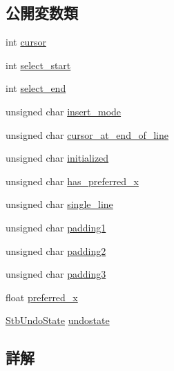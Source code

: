 \subsection*{公開変数類}
\begin{DoxyCompactItemize}
\item 
int \mbox{\hyperlink{struct_s_t_b___textedit_state_a7a1414f3286070306a5184f9473ccf9f}{cursor}}
\item 
int \mbox{\hyperlink{struct_s_t_b___textedit_state_a74d595403e0b6f99cd0163ee87f4344d}{select\+\_\+start}}
\item 
int \mbox{\hyperlink{struct_s_t_b___textedit_state_abf8b1b1064770e4579c5bb8c4a41d8f0}{select\+\_\+end}}
\item 
unsigned char \mbox{\hyperlink{struct_s_t_b___textedit_state_af26029a4f1f76d043afd35072fabcb4b}{insert\+\_\+mode}}
\item 
unsigned char \mbox{\hyperlink{struct_s_t_b___textedit_state_a0e7ba5f610f5dc2d643bef0f223ada9c}{cursor\+\_\+at\+\_\+end\+\_\+of\+\_\+line}}
\item 
unsigned char \mbox{\hyperlink{struct_s_t_b___textedit_state_a11a63150e95225aacd204d6ef160c0c0}{initialized}}
\item 
unsigned char \mbox{\hyperlink{struct_s_t_b___textedit_state_aaca2d581ed565f86288038816274e007}{has\+\_\+preferred\+\_\+x}}
\item 
unsigned char \mbox{\hyperlink{struct_s_t_b___textedit_state_a63299aca2cb4e009dfa41cda5e651316}{single\+\_\+line}}
\item 
unsigned char \mbox{\hyperlink{struct_s_t_b___textedit_state_a1e43e8ac88a8c7f2bba645b333a8bdc7}{padding1}}
\item 
unsigned char \mbox{\hyperlink{struct_s_t_b___textedit_state_af5a708e49f23f79bb14c9b0f4ad03371}{padding2}}
\item 
unsigned char \mbox{\hyperlink{struct_s_t_b___textedit_state_a4c42530e4919171df25b1f00bb95a887}{padding3}}
\item 
float \mbox{\hyperlink{struct_s_t_b___textedit_state_a527319df94e0fe262548fb48bebf3dea}{preferred\+\_\+x}}
\item 
\mbox{\hyperlink{struct_stb_undo_state}{Stb\+Undo\+State}} \mbox{\hyperlink{struct_s_t_b___textedit_state_a7e1f0366bbd57e01a4f49a720beb9ead}{undostate}}
\end{DoxyCompactItemize}


\subsection{詳解}



